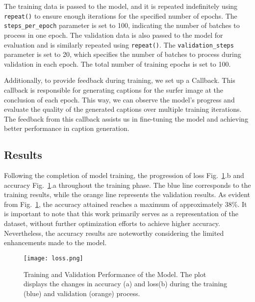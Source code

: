 \documentclass[runningheads]{llncs}
\begin{document}
The training data is passed to the model, and it is repeated indefinitely using \texttt{repeat()} to ensure enough iterations for the specified number of epochs. The \texttt{steps\_per\_epoch} parameter is set to 100, indicating the number of batches to process in one epoch. The validation data is also passed to the model for evaluation and is similarly repeated using \texttt{repeat()}. The \texttt{validation\_steps} parameter is set to 20, which specifies the number of batches to process during validation in each epoch. The total number of training epochs is set to 100. 

Additionally, to provide feedback during training, we set up a Callback. This callback is responsible for generating captions for the surfer image at the conclusion of each epoch. This way, we can observe the model's progress and evaluate the quality of the generated captions over multiple training iterations. The feedback from this callback assists us in fine-tuning the model and achieving better performance in caption generation.

\subsection{Results}

Following the completion of model training, the progression of loss Fig.~\ref{fig4}.b and accuracy  Fig.~\ref{fig4}.a throughout the training phase. The blue line corresponds to the training results, while the orange line represents the validation results.
As evident from Fig.~\ref{fig4}, the accuracy attained reaches a maximum of approximately 38\%. It is important to note that this work primarily serves as a representation of the dataset, without further optimization efforts to achieve higher accuracy. Nevertheless, the accuracy results are noteworthy considering the limited enhancements made to the model.

\begin{figure}
  \texttt{[image: loss.png]}
  \caption{Training and Validation Performance of the Model. The plot displays the changes in accuracy (a) and loss(b) during the training (blue) and validation (orange) process.} \label{fig4}
\end{figure}
\end{document}
